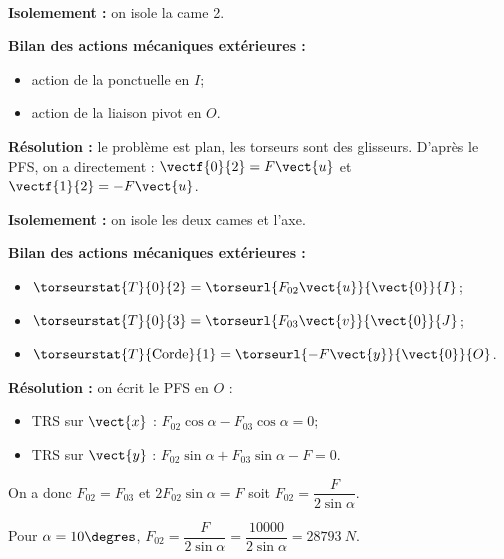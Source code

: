 \ifprof
\begin{corrige}~\\

\textbf{Isolemement : } on isole la came 2.

\textbf{Bilan des actions mécaniques extérieures :}
\begin{itemize}
\item action de la ponctuelle en $I$;
\item action de la liaison pivot en $O$. 
\end{itemize}

\textbf{Résolution : } le problème est plan, les torseurs sont des glisseurs. D'après le PFS, on a directement : 
$\vectf{0}{2} = F \vect{u}$
et $\vectf{1}{2} =- F \vect{u}$.
\vspace{1cm}

\textbf{Isolemement : } on isole les deux cames et l'axe. 

\textbf{Bilan des actions mécaniques extérieures :}
\begin{itemize}
\item $\torseurstat{T}{0}{2} = \torseurl{F_{02} \vect{u}}{\vect{0}}{I}$;
\item $\torseurstat{T}{0}{3} = \torseurl{F_{03} \vect{v}}{\vect{0}}{J}$;
\item $\torseurstat{T}{\text{Corde}}{1} = \torseurl{-F\vect{y} }{\vect{0}}{O}$.
\end{itemize}


\textbf{Résolution : } on écrit le PFS en $O$ :
\begin{itemize}
\item TRS sur $\vect{x}$ : $F_{02} \cos \alpha  - F_{03} \cos \alpha = 0 $;
\item TRS sur $\vect{y}$ : $F_{02} \sin \alpha  + F_{03} \sin \alpha  - F = 0$.
\end{itemize}

On a donc $F_{02}= F_{03}$ et $2 F_{02} \sin \alpha = F$ soit $F_{02} = \dfrac{F}{2 \sin \alpha}$.

Pour $\alpha = 10 \degres$,  $F_{02} = \dfrac{F}{2 \sin \alpha} = \dfrac{10 000}{2 \sin \alpha} = \SI{28793}{N}$.
\end{corrige}
\else
\fi


\ifprof
\begin{corrige}~\\
\end{corrige}
\else
\fi


